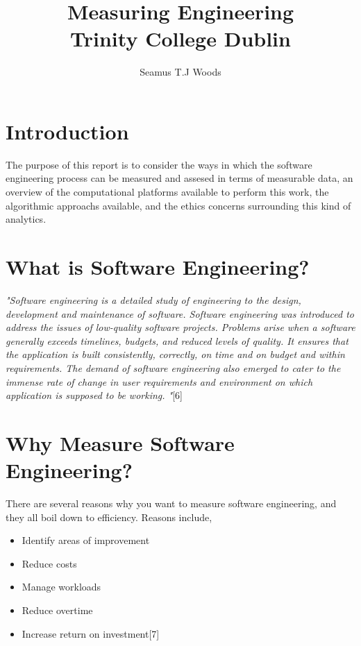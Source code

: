 \documentclass[12pt]{report}
\title{{Measuring Engineering}\\
	  {\large Trinity College Dublin}}
\author{Seamus T.J Woods}
\begin{document}
\maketitle
\date
\tableofcontents
\newpage

\section{Introduction}
The purpose of this report is to consider the ways in which the software engineering process can be measured and assesed in terms of measurable data, an overview of the computational platforms available to perform this work, the algorithmic approachs available, and the ethics concerns surrounding this kind of analytics.

\section{What is Software Engineering?}
\textit{"Software engineering is a detailed study of engineering to the design, development and maintenance of software. Software engineering was introduced to address the issues of low-quality software projects. Problems arise when a software generally exceeds timelines, budgets, and reduced levels of quality. It ensures that the application is built consistently, correctly, on time and on budget and within requirements. The demand of software engineering also emerged to cater to the immense rate of change in user requirements and environment on which application is supposed to be working. "}[6]

\section{Why Measure Software Engineering?}
There are several reasons why you want to measure software engineering, and they all boil down to efficiency. Reasons include, 
\begin{itemize}
\item Identify areas of improvement
\item Reduce costs
\item Manage workloads
\item Reduce overtime
\item Increase return on investment[7]
\end{itemize}
\end{document}
